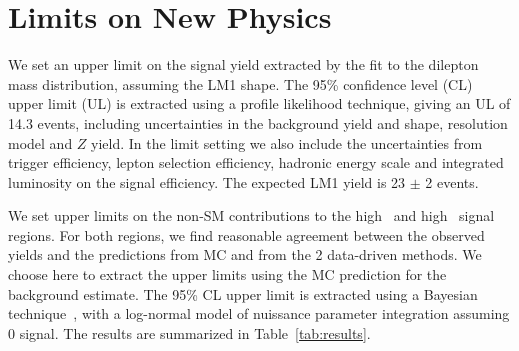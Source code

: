 \section{Limits on New Physics}
\label{sec:limit}

We set an upper limit on the signal yield extracted by the fit to the dilepton mass
distribution, assuming the LM1 shape. The 95\% confidence level (CL) upper limit (UL)
is extracted using a profile likelihood technique, giving an UL of 14.3 events, including
uncertainties in the background yield and shape, resolution model and $Z$ yield.
In the limit setting we also include the uncertainties from trigger efficiency,
lepton selection efficiency, hadronic energy scale and integrated luminosity on the signal efficiency.
The expected LM1 yield is 23 $\pm$ 2 events. 

We set upper limits on the non-SM contributions to the high \MET\ and high \Ht\ signal regions. 
For both regions, we find reasonable agreement between the observed yields and the predictions from MC and from the 2
data-driven methods. We choose here to extract the upper limits using the MC prediction for the
background estimate. The 95\% CL upper limit is extracted using a Bayesian technique~\cite{ref:cl95cms}, 
with a log-normal model of nuissance parameter integration assuming 0 signal. The results are summarized in 
Table~\ref{tab:results}. 

